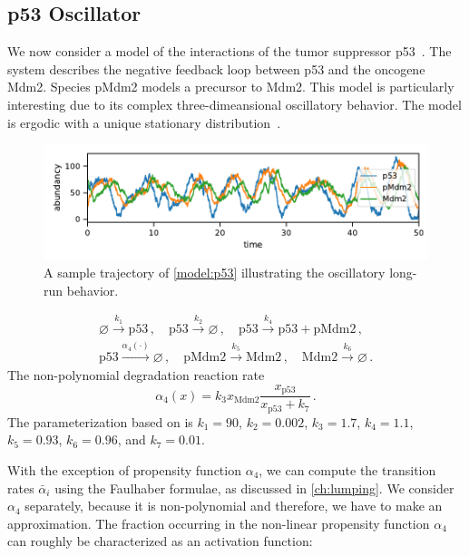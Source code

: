 \subsection{p53 Oscillator}
We now consider a model of the interactions of the tumor suppressor p53~\parencite{geva2006oscillations}. The system describes the negative feedback loop between  p53 and the oncogene Mdm2.
Species pMdm2 models a precursor to Mdm2. This model is particularly interesting due to its complex three-di\-mea\-nsional oscillatory behavior.
The model is ergodic with a unique stationary distribution~\parencite{gupta2014scalable}.
\begin{figure}[htb]
    \centering
    \includegraphics[width=\textwidth]{gfx/p53_traj.pdf}
    \caption[Sample trajectory (p53)]{A sample trajectory of \autoref{model:p53} illustrating the oscillatory long-run behavior. }
    \label{fig:p53:traj}
\end{figure}
\begin{model}[p53 Oscillator]\label{model:p53}
\begin{gather*}
\varnothing \xrightarrow{k_1} \mathrm{p53} \,,\quad
\mathrm{p53} \xrightarrow{k_2} \varnothing \,,\quad
\mathrm{p53} \xrightarrow{k_4} \mathrm{p53} + \mathrm{pMdm2}\,,\\
\mathrm{p53} \xrightarrow{\alpha_4(\cdot)} \varnothing \,,\quad
\mathrm{pMdm2} \xrightarrow{k_5} \mathrm{Mdm2} \,,\quad
\mathrm{Mdm2} \xrightarrow{k_6} \varnothing\,.
\end{gather*}
The non-polynomial degradation reaction rate
	\[
\alpha_4(x) =k_3 x_{\mathrm{Mdm2}} \frac{x_{\mathrm{p53}}}{x_{\mathrm{p53}} + k_7}\,.
\]
The parameterization based on \parencite{ale2013general} is $k_1=90$, $k_2=0.002$, $k_3=1.7$, $k_4=1.1$, $k_5=0.93$, $k_6=0.96$, and $k_7 = 0.01$.
\end{model}
With the exception of propensity function $\alpha_4$, we can compute the transition rates ${\bar{\alpha}}_i$ using the Faulhaber formulae, as discussed in \autoref{ch:lumping}.
We consider $\alpha_4$ separately, because it is non-polynomial and therefore, we have to make an approximation.
The fraction occurring in the non-linear propensity function $\alpha_4$ can roughly be characterized as an activation function:
